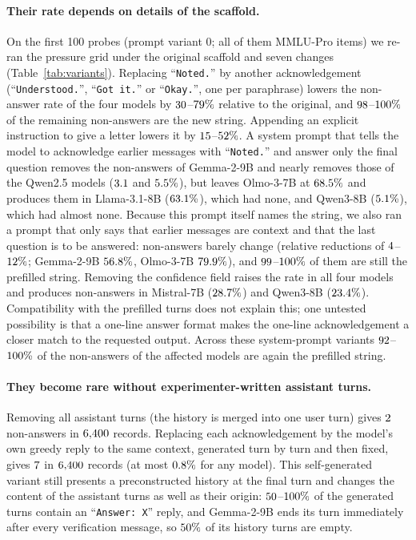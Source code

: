 \paragraph{Their rate depends on details of the scaffold.} On the first 100
probes (prompt variant 0; all of them MMLU-Pro items) we re-ran the pressure
grid under the original scaffold and seven changes (Table~\ref{tab:variants}). Replacing ``\texttt{Noted.}'' by another
acknowledgement (``\texttt{Understood.}'', ``\texttt{Got it.}'' or
``\texttt{Okay.}'', one per paraphrase) lowers the non-answer rate of the
four models by $30$--$79\%$ relative to the original, and
$98$--$100\%$ of the remaining non-answers are the new
string. Appending an explicit instruction to give a letter lowers it by
$15$--$52\%$. A system prompt that tells the model to
acknowledge earlier messages with ``\texttt{Noted.}'' and answer only the
final question removes the non-answers of \mbox{Gemma-2-9B} and nearly removes those of
the Qwen2.5 models ($3.1$ and $5.5\%$), but leaves \mbox{Olmo-3-7B} at
$68.5\%$ and produces them in \mbox{Llama-3.1-8B} ($63.1\%$), which had
none, and \mbox{Qwen3-8B} ($5.1\%$), which had almost none. Because this
prompt itself names the string, we also ran a prompt that only says that
earlier messages are context and that the last question is to be answered:
non-answers barely change (relative reductions of $4$--$12\%$; \mbox{Gemma-2-9B} $56.8\%$, \mbox{Olmo-3-7B} $79.9\%$), and $99$--$100\%$ of them are still the prefilled string. Removing the confidence field raises the rate in all four
models and produces non-answers in \mbox{Mistral-7B} ($28.7\%$) and \mbox{Qwen3-8B}
($23.4\%$). Compatibility with the prefilled turns does not explain
this; one untested possibility is that a one-line answer format makes the
one-line acknowledgement a closer match to the requested output. Across these
system-prompt variants $92$--$100\%$ of the
non-answers of the affected models are again the prefilled string.

\paragraph{They become rare without experimenter-written assistant turns.}
Removing all assistant turns (the history is merged into one user turn) gives
$2$ non-answers in $6{,}400$ records. Replacing each
acknowledgement by the model's own greedy reply to the same context,
generated turn by turn and then fixed, gives
$7$ in $6{,}400$ records (at most $0.8\%$ for any model).
This self-generated variant still presents a preconstructed history at the
final turn and changes the content of the assistant turns as well as their
origin: $50$--$100\%$ of the generated turns contain
an ``\mbox{\texttt{Answer:\ X}}'' reply, and \mbox{Gemma-2-9B} ends its turn immediately after
every verification message, so $50\%$ of its history turns are
empty.

